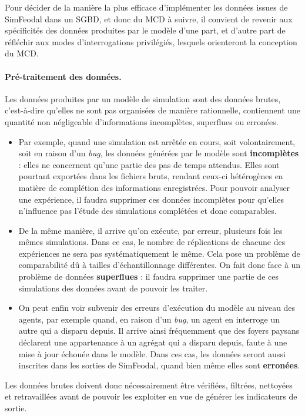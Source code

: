 Pour décider de la manière la plus efficace d'implémenter les données issues de SimFeodal dans un SGBD, et donc du MCD à suivre, il convient de revenir aux spécificités des données produites par le modèle d'une part, et d'autre part de réfléchir aux modes d'interrogations privilégiés, lesquels orienteront la conception du MCD.


\paragraph{Pré-traitement des données.}
Les données produites par un modèle de simulation sont des données \og brutes\fg{}, c'est-à-dire qu'elles ne sont pas organisées de manière rationnelle, contiennent une quantité non négligeable d'informations incomplètes, superflues ou erronées.
\begin{itemize}
	\item Par exemple, quand une simulation est arrêtée en cours, soit volontairement, soit en raison d'un \textit{bug}, les données générées par le modèle sont \textbf{incomplètes} : elles ne concernent qu'une partie des pas de temps attendus.
	Elles sont pourtant exportées dans les fichiers bruts, rendant ceux-ci hétérogènes en matière de complétion des informations enregistrées.
	Pour pouvoir analyser une expérience, il faudra supprimer ces données incomplètes pour qu'elles n'influence pas l'étude des simulations complétées et donc comparables.
	\item De la même manière, il arrive qu'on exécute, par erreur, plusieurs fois les mêmes simulations.
	Dans ce cas, le nombre de réplications de chacune des expériences ne sera pas systématiquement le même.
	Cela pose un problème de comparabilité dû à tailles d'échantillonnage différentes.
	On fait donc face à un problème de données \textbf{superflues} : il faudra supprimer une partie de ces simulations des données avant de pouvoir les traiter.
	\item On peut enfin voir subvenir des erreurs d'exécution du modèle au niveau des agents, par exemple quand, en raison d'un \textit{bug}, un agent en interroge un autre qui a disparu depuis.
	Il arrive ainsi fréquemment que des foyers paysans déclarent une appartenance à un agrégat qui a disparu depuis, faute à une mise à jour échouée dans le modèle.
	Dans ces cas, les données seront aussi inscrites dans les sorties de SimFeodal, quand bien même elles sont \textbf{erronées}.
\end{itemize}

Les données brutes doivent donc nécessairement être vérifiées, filtrées, nettoyées et retravaillées avant de pouvoir les exploiter en vue de générer les indicateurs de sortie.

